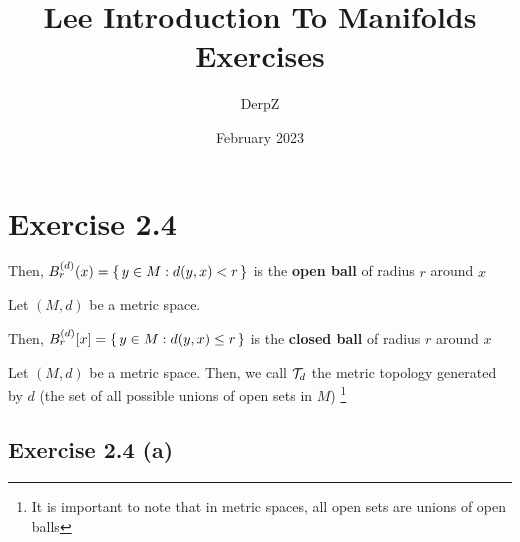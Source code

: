 \documentclass{article}
\title{Lee Introduction To Manifolds Exercises}
\author{DerpZ}
\date{February 2023}
\begin{document}
\maketitle

\section{Exercise 2.4}

\begin{definition}

Then, 
$ B_{r}^{(d)} (x)  = \set{y \in M : d(y, x) < r}$ is the \textbf{open ball} of radius $r$ around $x$ 
\end{definition}

\begin{definition}
Let $(M, d)$ be a metric space.

Then, 
$ B_{r}^{(d)} [x]  = \set{y \in M : d(y, x) \leq r}$ is the \textbf{closed ball} of radius $r$ around $x$ 
\end{definition}

\begin{definition}
    Let $(M, d)$ be a metric space. Then, we call $\mathcal{T}_d$ the metric topology generated
    by $d$ (the set of all possible unions of open sets in $M$)
    \footnote{It is important to note that in metric spaces, all open sets are unions of open balls}
\end{definition}

\subsection{Exercise 2.4 (a)}
\end{document}
